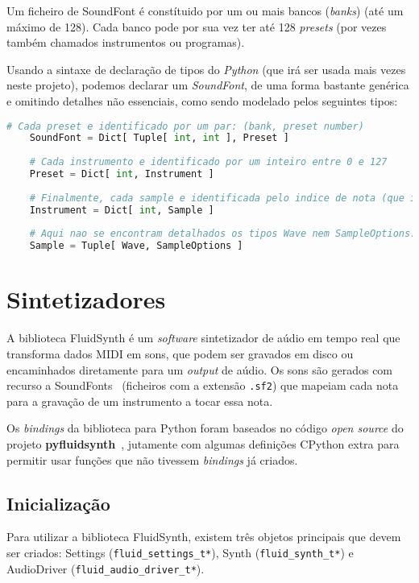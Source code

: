Um ficheiro de SoundFont é constítuido por um ou mais bancos (\textit{banks}) (até um máximo de 128). Cada banco pode por sua vez ter até 128 \textit{presets} (por vezes também chamados instrumentos ou programas).

Usando a sintaxe de declaração de tipos do \textit{Python} (que irá ser usada mais vezes neste projeto), podemos declarar um \textit{SoundFont}, de uma forma bastante genérica e omitindo detalhes não essenciais, como sendo modelado pelos seguintes tipos:
\newpage
\begin{lstlisting}[caption=Sistema de Tipos de um ficheiro SoundFont,language=Python]
    # Cada preset e identificado por um par: (bank, preset number)
    SoundFont = Dict[ Tuple[ int, int ], Preset ]
    
    # Cada instrumento e identificado por um inteiro entre 0 e 127
    Preset = Dict[ int, Instrument ]
    
    # Finalmente, cada sample e identificada pelo indice de nota (que iremos abordar mais a frente em detalhe, no capitulo sobre sintetizadores)
    Instrument = Dict[ int, Sample ]
    
    # Aqui nao se encontram detalhados os tipos Wave nem SampleOptions.
    Sample = Tuple[ Wave, SampleOptions ]
\end{lstlisting}


\section{Sintetizadores}
A biblioteca FluidSynth é um \textit{software} sintetizador de aúdio em tempo real que transforma dados MIDI em sons, que podem ser gravados em disco ou encaminhados diretamente para um \textit{output} de aúdio. Os sons são gerados com recurso a SoundFonts~\cite{soundfont} (ficheiros com a extensão \texttt{.sf2}) que mapeiam cada nota para a gravação de um instrumento a tocar essa nota.

Os \textit{bindings} da biblioteca para Python foram baseados no código \textit{open source} do projeto \textbf{pyfluidsynth}~\cite{pyfluidsynth}, jutamente com algumas definições CPython extra para permitir usar funções que não tivessem \textit{bindings} já criados.

\subsection{Inicialização}
Para utilizar a biblioteca FluidSynth, existem três objetos principais que devem ser criados: Settings (\texttt{fluid\_settings\_t*}), Synth (\texttt{fluid\_synth\_t*}) e AudioDriver (\texttt{fluid\_audio\_driver\_t*}).

